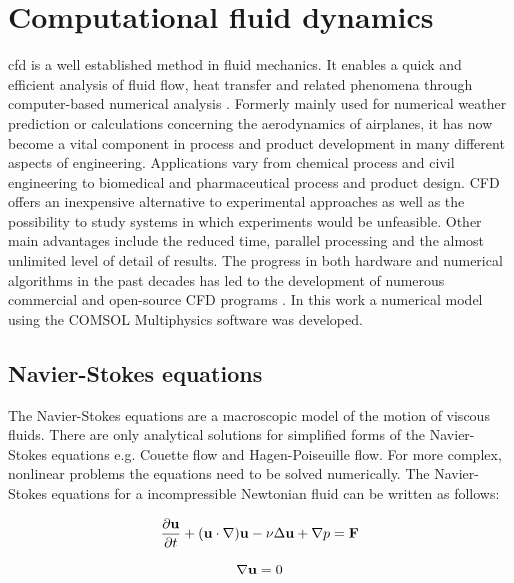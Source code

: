 \section{Computational fluid dynamics}
\label{sec:CFD}
\Gls{cfd} is a well established method in fluid mechanics. It enables a quick and efficient analysis of fluid flow, heat transfer and related phenomena through computer-based numerical analysis \cite{versteeg2007introduction}. Formerly mainly used for numerical weather prediction or calculations concerning the aerodynamics of airplanes, it has now become a vital component in process and
product development in many different aspects of engineering. Applications vary from chemical process and civil engineering to biomedical and pharmaceutical
process and product design. CFD offers an inexpensive alternative to experimental approaches as well as the possibility to study systems in which experiments
would be unfeasible. Other main advantages include the reduced time, parallel processing and the almost unlimited level of detail of results. The progress in both hardware and numerical algorithms in the past decades has led to the development of numerous commercial and open-source CFD programs \cite{ghia1982high}. In this work a numerical model using the COMSOL Multiphysics software was developed.

\subsection{Navier-Stokes equations}
\label{subsec:Navier_Stokes}
The Navier-Stokes equations are a macroscopic model of the motion of viscous fluids. There are only analytical solutions for simplified forms of the Navier-Stokes equations e.g. Couette flow and Hagen-Poiseuille flow. For more complex, nonlinear problems the equations need to be solved numerically. The Navier-Stokes equations for a incompressible Newtonian fluid can be written as follows: 

\begin{equation}
{\partial{\bf u}\over{\partial t}} + ({\bf u} \cdot \nabla) {\bf u} - \nu\Delta{\bf u}+ \nabla p = {\bf F}
\label{eq:Concervation of momentum }
\end{equation}

\begin{equation}
\nabla{\bf u} = 0
\label{eq:Conservation of mass }
\end{equation}


